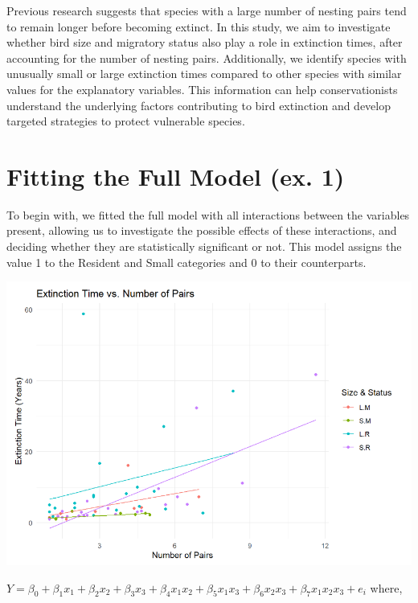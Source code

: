 \documentclass{article}
\begin{document}
Previous research suggests that species with a large number of nesting pairs tend to remain longer before becoming extinct. In this study, we aim to investigate whether bird size and migratory status also play a role in extinction times, after accounting for the number of nesting pairs. Additionally, we identify species with unusually small or large extinction times compared to other species with similar values for the explanatory variables. This information can help conservationists understand the underlying factors contributing to bird extinction and develop targeted strategies to protect vulnerable species.

\section{Fitting the Full Model (ex. 1)}
To begin with, we fitted the full model with all interactions between the variables present, allowing us to investigate the possible effects of these interactions, and deciding whether they are statistically significant or not. This model assigns the value 1 to the Resident and Small categories and 0 to their counterparts.
\begin{center}
\includegraphics[scale=0.5]{graphs/graph1.png}
\end{center}


$Y = \beta_0 + \beta_1 x_1 + \beta_2 x_2 + \beta_3 x_3 + \beta_4 x_1 x_2 + \beta_5 x_1 x_3 + \beta_6 x_2 x_3 + \beta_7 x_1 x_2 x_3 +e_i$
where, 
\end{document}
